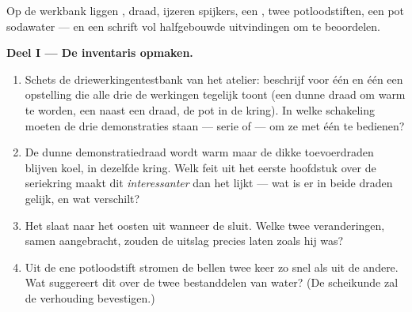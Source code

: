 \begin{problem}\label{pb:g8:electric-current-effects:1}
Op de werkbank liggen , draad, ijzeren spijkers, een
, twee potloodstiften, een pot sodawater --- en een schrift
vol halfgebouwde uitvindingen om te beoordelen.

\medskip\noindent\textbf{Deel I --- De inventaris opmaken.}
\begin{enumerate}
  \item Schets de driewerkingentestbank van het atelier: beschrijf
        voor één  en één  een opstelling
        die alle drie de werkingen tegelijk toont (een dunne draad om
        warm te worden, een  naast een draad, de pot in de
        kring). In welke schakeling moeten de drie demonstraties
        staan --- serie of  --- om ze met één
         te bedienen?
  \item De dunne demonstratiedraad wordt warm maar de dikke
        toevoerdraden blijven koel, in dezelfde kring. Welk feit uit
        het eerste hoofdstuk over de seriekring maakt dit
        \emph{interessanter} dan het lijkt --- wat is er in beide
        draden gelijk, en wat verschilt?
  \item Het  slaat naar het oosten uit wanneer de
         sluit. Welke twee veranderingen, samen
        aangebracht, zouden de uitslag precies laten zoals hij was?
  \item Uit de ene potloodstift stromen de bellen twee keer zo snel
        als uit de andere. Wat suggereert dit over de twee
        bestanddelen van water? (De scheikunde zal de verhouding
        bevestigen.)
\end{enumerate}


\end{problem}
